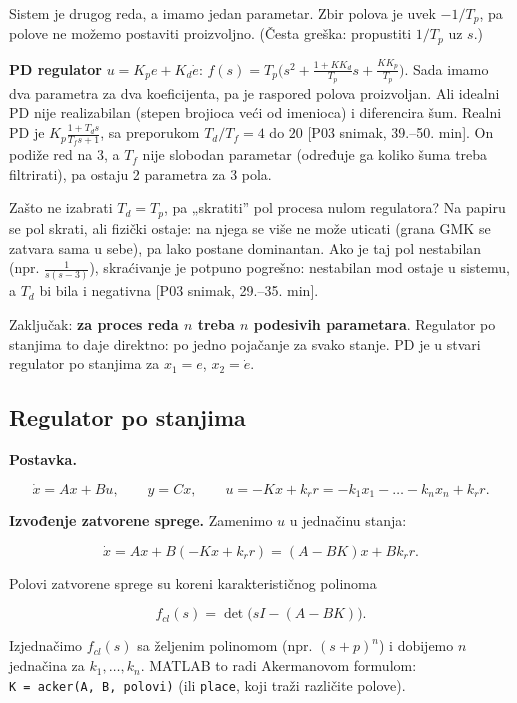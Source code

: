 \documentclass[11pt,a4paper,parskip=half,headsepline,numbers=noenddot]{scrartcl}
\DeclareRobustCommand{\izvor}[1]{{\small\color{izvorC}[#1]}}
\begin{document}
Sistem je drugog reda, a imamo jedan parametar. Zbir polova je uvek \(-1/T_p\), pa polove ne možemo postaviti proizvoljno. (Česta greška: propustiti \(1/T_p\) uz \(s\).)

\textbf{PD regulator} \(u = K_pe + K_d\dot e\): \(f(s) = T_p\big(s^2 + \frac{1 + KK_d}{T_p}s + \frac{KK_p}{T_p}\big)\). Sada imamo dva parametra za dva koeficijenta, pa je raspored polova proizvoljan. Ali idealni PD nije realizabilan (stepen brojioca veći od imenioca) i diferencira šum. Realni PD je \(K_p\frac{1 + T_ds}{T_fs+1}\), sa preporukom \(T_d/T_f = 4\) do \(20\) \izvor{P03 snimak, 39.--50. min}. On podiže red na 3, a \(T_f\) nije slobodan parametar (određuje ga koliko šuma treba filtrirati), pa ostaju 2 parametra za 3 pola.

\begin{zasto}
Zašto ne izabrati \(T_d = T_p\), pa „skratiti'' pol procesa nulom regulatora? Na papiru se pol skrati, ali fizički ostaje: na njega se više ne može uticati (grana GMK se zatvara sama u sebe), pa lako postane dominantan. Ako je taj pol nestabilan (npr. \(\frac{1}{s(s-3)}\)), skraćivanje je potpuno pogrešno: nestabilan mod ostaje u sistemu, a \(T_d\) bi bila i negativna \izvor{P03 snimak, 29.--35. min}.
\end{zasto}

Zaključak: \textbf{za proces reda \(n\) treba \(n\) podesivih parametara}. Regulator po stanjima to daje direktno: po jedno pojačanje za svako stanje. PD je u stvari regulator po stanjima za \(x_1 = e\), \(x_2 = \dot e\).

\subsection{Regulator po stanjima}

\textbf{Postavka.}

\[\dot x = Ax + Bu,\qquad y = Cx,\qquad u = -Kx + k_r r = -k_1x_1 - \dots - k_nx_n + k_r r .\]

\textbf{Izvođenje zatvorene sprege.} Zamenimo \(u\) u jednačinu stanja:

\[\dot x = Ax + B(-Kx + k_r r) = (A - BK)x + Bk_r r .\]

Polovi zatvorene sprege su koreni karakterističnog polinoma

\[f_{cl}(s) = \det\big(sI - (A - BK)\big).\]

Izjednačimo \(f_{cl}(s)\) sa željenim polinomom (npr. \((s+p)^n\)) i dobijemo \(n\) jednačina za \(k_1,\dots,k_n\). MATLAB to radi Akermanovom formulom: \texttt{K\ =\ acker(\allowbreak{}A,\allowbreak{}\ B,\allowbreak{}\ polovi)} (ili \texttt{place}, koji traži različite polove).
\end{document}
